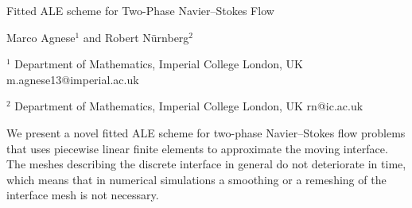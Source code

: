 \documentclass[12pt]{article}
\begin{document}
Fitted ALE scheme for Two-Phase Navier--Stokes Flow

Marco Agnese$^1$   %
and
Robert N\"urnberg$^2$

$^1$ Department of Mathematics, Imperial College London, UK
m.agnese13@imperial.ac.uk

$^2$ Department of Mathematics, Imperial College London, UK
rn@ic.ac.uk

\vspace{4mm}

\noindent%
We present a novel fitted ALE scheme for two-phase Navier--Stokes flow problems
that uses piecewise linear finite elements to approximate the moving interface.
The meshes describing the discrete interface in general do not deteriorate in
time, which means that in numerical simulations a smoothing or a remeshing of
the interface mesh is not necessary.
\end{document}
